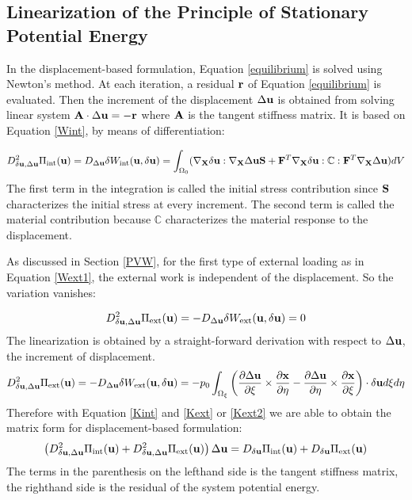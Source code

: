 %
\subsection{Linearization of the Principle of Stationary Potential Energy}
In the displacement-based formulation, Equation \ref{equilibrium} is solved using Newton's method. At each iteration, a residual $\bold{r}$ of Equation \ref{equilibrium} is evaluated. Then the increment of the displacement $\Delta\bold{u}$ is obtained from solving linear system $\bold{A} \cdot \Delta\bold{u} = -\bold{r}$ where $\bold{A}$ is the tangent stiffness matrix. It is based on Equation \ref{Wint}, by means of differentiation:

\begin{equation} \label{Kint}
D^2_{\delta\bold{u}, \Delta\bold{u}}\Pi_\mathrm{int}(\bold{u}) = D_{\Delta{\bold{u}}}\delta{W_\mathrm{int}}(\bold{u}, \delta{\bold{u}}) = \int_{\Omega_0}(\nabla_{\bold{X}}\delta\bold{u} : \nabla_{\bold{X}}\Delta\bold{u}\bold{S} + \bold{F}^T\nabla_{\bold{X}}\delta{\bold{u}} : \mathbb{C} : \bold{F}^T \nabla_{\bold{X}}\Delta\bold{u})dV
\end{equation}
The first term in the integration is called the initial stress contribution since $\bold{S}$ characterizes the initial stress at every increment. The second term is called the material contribution because $\mathbb{C}$ characterizes the material response to the displacement.

As discussed in Section \ref{PVW}, for the first type of external loading as in Equation \ref{Wext1}, the external work is independent of the displacement. So the variation vanishes:

\begin{equation} \label{Kext}
D^2_{\delta\bold{u}, \Delta\bold{u}}\Pi_\mathrm{ext}(\bold{u}) = - D_{\Delta{\bold{u}}}\delta{W_\mathrm{ext}}(\bold{u}, \delta{\bold{u}}) = 0
\end{equation}
The linearization is obtained by a straight-forward derivation with respect to $\Delta\bold{u}$, the increment of displacement. 
\begin{equation}  \label{Kext2}
D^2_{\delta\bold{u}, \Delta\bold{u}}\Pi_\mathrm{ext}(\bold{u}) = - D_{\Delta{\bold{u}}}\delta{W_\mathrm{ext}}(\bold{u}, \delta{\bold{u}}) = - p_0\int_{\Omega_{\xi}}  \left(\frac{\partial \Delta\bold{u}}{\partial{\xi}} \times
\frac{\partial\bold{x}}{\partial\eta} - \frac{\partial \Delta\bold{u}}{\partial{\eta}} \times
\frac{\partial\bold{x}}{\partial\xi}    \right) \cdot \delta{\bold{u}} d\xi d\eta
\end{equation}
Therefore with Equation \ref{Kint} and \ref{Kext} or \ref{Kext2} we are able to obtain the matrix form for displacement-based formulation:
\begin{equation} \label{matrix}
\left( D^2_{\delta\bold{u}, \Delta\bold{u}}\Pi_\mathrm{int}(\bold{u}) + D^2_{\delta\bold{u}, \Delta\bold{u}}\Pi_\mathrm{ext}(\bold{u})  \right) \Delta\bold{u} = D_{\delta\bold{u}}\Pi_\mathrm{int}(\bold{u}) + D_{\delta\bold{u}}\Pi_\mathrm{ext}(\bold{u})
\end{equation}
The terms in the parenthesis on the lefthand side is the tangent stiffness matrix, the righthand side is the residual of the system potential energy.


